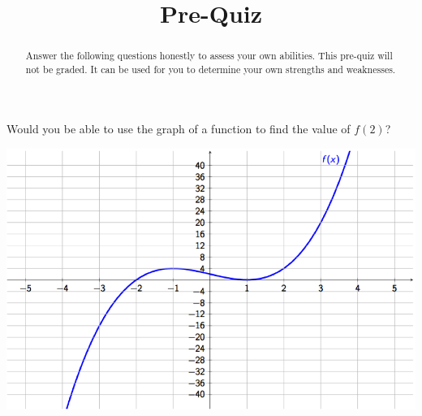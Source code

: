 \documentclass{ximera}
\title{Pre-Quiz}
\begin{document}
\begin{abstract}
Answer the following questions honestly to assess your own abilities. This pre-quiz will not be graded. It can be used for you to determine your own strengths and weaknesses.
\end{abstract}
\maketitle


\begin{problem} 
    Would you be able to use the graph of a function to find the value of $f(2)$?
    
    \begin{center} \includegraphics[scale=0.7]{Graphing1.png} \end{center}

  \begin{multipleChoice}
  \end{multipleChoice}
\end{problem}
\end{document}
